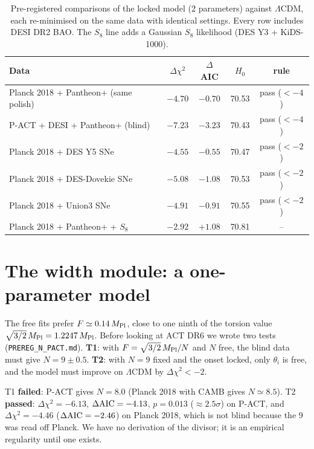 \documentclass[11pt]{article}
\newcommand{\Mp}{M_{\rm Pl}}
\begin{document}
\begin{table}[h]
\centering
\small
\begin{tabular}{lcccc}
\toprule
Data & $\Delta\chi^2$ & $\Delta$AIC & $H_0$ & rule\\
\midrule
Planck 2018 + Pantheon+ (same polish) & $-4.70$ & $-0.70$ & 70.53 & pass ($<-4$)\\
P-ACT + DESI + Pantheon+ (blind) & $-7.23$ & $-3.23$ & 70.43 & pass ($<-4$)\\
Planck 2018 + DES Y5 SNe & $-4.55$ & $-0.55$ & 70.47 & pass ($<-2$)\\
Planck 2018 + DES-Dovekie SNe & $-5.08$ & $-1.08$ & 70.53 & pass ($<-2$)\\
Planck 2018 + Union3 SNe & $-4.91$ & $-0.91$ & 70.55 & pass ($<-2$)\\
Planck 2018 + Pantheon+ + $S_8$ & $-2.92$ & $+1.08$ & 70.81 & --\\
\bottomrule
\end{tabular}
\caption{Pre-registered comparisons of the locked model (2 parameters) against $\Lambda$CDM, each
re-minimised on the same data with identical settings. Every row includes DESI DR2 BAO. The $S_8$ line
adds a Gaussian $S_8$ likelihood (DES Y3 + KiDS-1000).}
\label{tab:prereg}
\end{table}

\section{The width module: a one-parameter model}\label{sec:width}
The free fits prefer $F\simeq0.14\,\Mp$, close to one ninth of the torsion value
$\sqrt{3/2}\,\Mp=1.2247\,\Mp$. Before looking at ACT DR6 we wrote two tests
(\texttt{PREREG\_N\_PACT.md}). \textbf{T1}: with $F=\sqrt{3/2}\,\Mp/N$ and $N$ free, the blind data
must give $N=9\pm0.5$. \textbf{T2}: with $N=9$ fixed and the onset locked, only $\theta_i$ is free,
and the model must improve on $\Lambda$CDM by $\Delta\chi^2<-2$.

T1 \textbf{failed}: P-ACT gives $N=8.0$ (Planck 2018 with CAMB gives $N\simeq8.5$). T2
\textbf{passed}: $\Delta\chi^2=-6.13$, $\Delta{\rm AIC}=-4.13$, $p=0.013$ ($\approx2.5\sigma$) on P-ACT, and
$\Delta\chi^2=-4.46$ ($\Delta{\rm AIC}=-2.46$) on Planck 2018, which is not blind because the 9 was read
off Planck. We have no derivation of the divisor; it is an empirical regularity until one exists.
\end{document}
